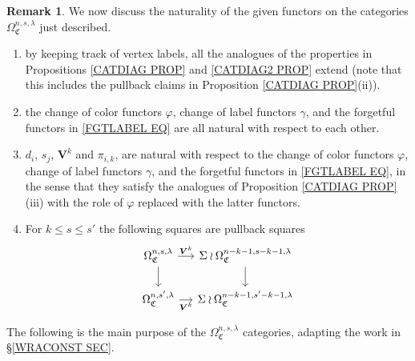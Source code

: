 \documentclass[a4paper,10pt
]{article}%
\numberwithin{equation}{section}
\numberwithin{figure}{section}
\theoremstyle{definition} %
\newtheorem{remark}[equation]{Remark}%
\newcommand{\1}{\ensuremath{\mathbbm 1}}%
\begin{document}
\begin{remark}
	We now discuss the naturality of the given functors on the categories
	$\Omega_{\mathfrak{C}}^{n,s,\lambda}$ just described.
	\begin{enumerate}[label=(\roman*)]
		\item by keeping track of vertex labels, all the analogues of the properties in Propositions \ref{CATDIAG PROP} and \ref{CATDIAG2 PROP} extend (note that this includes the pullback claims in 
		Proposition \ref{CATDIAG PROP}(ii)).
		\item the change of color functors $\varphi$, change of label functors $\gamma$, and the forgetful functors in
		\eqref{FGTLABEL EQ} are all natural with respect to each other.
		\item $d_i$, $s_j$, $\boldsymbol{V}^k$
		and $\pi_{i,k}$, are natural with respect to the change of color functors $\varphi$, change of label functors $\gamma$, and the forgetful functors in
		\eqref{FGTLABEL EQ}, 
		in the sense that they satisfy the analogues of  
		Proposition \ref{CATDIAG PROP}(iii) with 
		the role of $\varphi$ replaced with the latter functors.
		\item
		For $k \leq s \leq s'$ the following squares are pullback squares
		\[
		\begin{tikzcd}[column sep = small, row sep = small]
		\Omega^{n,s,\lambda}_{\mathfrak{C}} \ar{r}{\boldsymbol{V}^k} \ar{dd} &
		\Sigma \wr \Omega^{n-k-1,s-k-1,\lambda}_{\mathfrak{C}} \ar{dd}
		\\
		\\
		\Omega^{n,s',\lambda}_{\mathfrak{C}} \ar{r}[swap]{\boldsymbol{V}^k} &
		\Sigma \wr \Omega^{n-k-1,s'-k-1,\lambda}_{\mathfrak{C}}
		\end{tikzcd}
		\]
	\end{enumerate}
\end{remark}

The following is the main purpose of the 
$\Omega_{\mathfrak{C}}^{n,s,\lambda}$ categories,
adapting the work in \S \ref{WRACONST SEC}.
\end{document}
